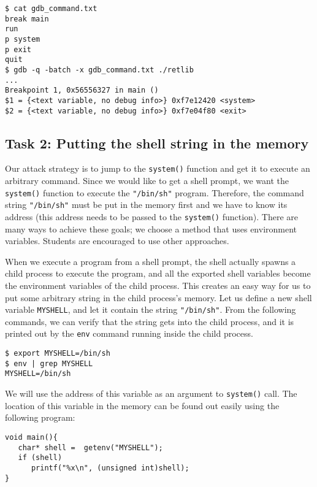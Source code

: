 \begin{lstlisting}
$ cat gdb_command.txt
break main
run
p system
p exit
quit
$ gdb -q -batch -x gdb_command.txt ./retlib
...
Breakpoint 1, 0x56556327 in main ()
$1 = {<text variable, no debug info>} 0xf7e12420 <system>
$2 = {<text variable, no debug info>} 0xf7e04f80 <exit>
\end{lstlisting}
 



\subsection{Task 2: Putting the shell string in the memory}

Our attack strategy is to jump to the \texttt{system()} function and 
get it to execute an arbitrary command. Since we would like to 
get a shell prompt, we want the \texttt{system()} function
to execute the \texttt{"/bin/sh"} program. Therefore, the 
command string \texttt{"/bin/sh"} must be put in the memory first and 
we have to know its address (this address needs to be passed to 
the \texttt{system()} function). There are many ways to
achieve these goals; we choose a method that uses environment variables.
Students are encouraged to use other approaches. 

When we execute a program from a shell prompt, the shell actually 
spawns a child process to execute the program, and all 
the exported shell variables become the environment variables 
of the child process. This creates an easy way for us to 
put some arbitrary string in the child process's memory. 
Let us define a new shell variable \texttt{MYSHELL}, and let it
contain the string \texttt{"/bin/sh"}. From the following commands,
we can verify that the string gets into the child process, and it is 
printed out by the \texttt{env} command running inside the child process.

\begin{lstlisting}
$ export MYSHELL=/bin/sh
$ env | grep MYSHELL
MYSHELL=/bin/sh
\end{lstlisting}

We will use the address of this variable as an argument to {\tt system()} call.
The location of this variable in the memory can be found out easily using the 
following program: 

\begin{lstlisting}
void main(){
   char* shell =  getenv("MYSHELL");
   if (shell) 
      printf("%x\n", (unsigned int)shell);
}
\end{lstlisting}

